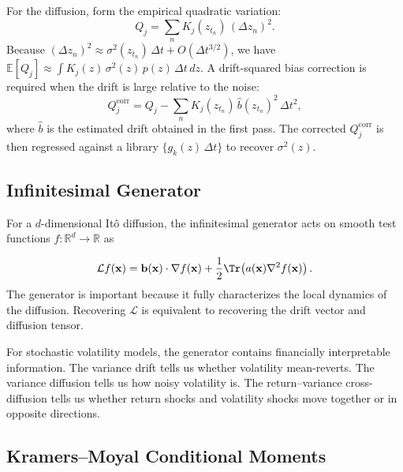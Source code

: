 \documentclass[reprint, amsmath, amssymb, aps, prl, superscriptaddress, nofootinbib]{revtex4-2}
\newcommand{\R}{\mathbb{R}}
\begin{document}
For the diffusion, form the empirical quadratic variation:
\begin{equation}
  Q_j = \sum_{n} K_j(z_{t_n})\,(\Delta z_n)^2.
\end{equation}
Because $(\Delta z_n)^2 \approx \sigma^2(z_{t_n})\,\Delta t + O(\Delta t^{3/2})$,
we have $\mathbb{E}[Q_j] \approx \int K_j(z)\,\sigma^2(z)\,p(z)\,\Delta t\,dz$.
A drift-squared bias correction is required when the drift is large relative to
the noise:
\begin{equation}
  Q_j^{\mathrm{corr}} = Q_j - \sum_{n} K_j(z_{t_n})\,\hat{b}(z_{t_n})^2\,\Delta t^2,
  \label{eq:bias_correction}
\end{equation}
where $\hat{b}$ is the estimated drift obtained in the first pass. The corrected
$Q_j^{\mathrm{corr}}$ is then regressed against a library $\{g_k(z)\,\Delta t\}$
to recover $\sigma^2(z)$.

\subsection{Infinitesimal Generator}

For a $d$-dimensional It\^{o} diffusion, the infinitesimal generator acts on smooth test functions $f:\R^d\to\R$ as

\begin{equation}
  \mathcal{L}f(\mathbf{x})
  =
  \mathbf{b}(\mathbf{x})\cdot\nabla f(\mathbf{x})
  +
  \frac{1}{2}
  \Tr\!\left(a(\mathbf{x})\nabla^2f(\mathbf{x})\right).
  \label{eq:generator}
\end{equation}
The generator is important because it fully characterizes the local dynamics of
the diffusion. Recovering $\mathcal{L}$ is equivalent to recovering the drift
vector and diffusion tensor.

For stochastic volatility models, the generator contains financially
interpretable information. The variance drift tells us whether volatility
mean-reverts. The variance diffusion tells us how noisy volatility is. The
return--variance cross-diffusion tells us whether return shocks and volatility
shocks move together or in opposite directions.

\subsection{Kramers--Moyal Conditional Moments}
\end{document}
